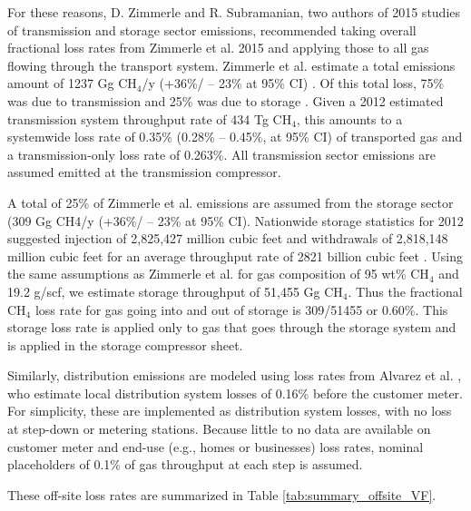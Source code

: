 \documentclass[11pt]{report}
\begin{document}
For these reasons, D. Zimmerle and R. Subramanian, two authors of 2015 studies of transmission and storage sector emissions, recommended \cite{ZimmerleEmail} taking overall fractional loss rates from Zimmerle et al. 2015 \cite{Zimmerle2015} and applying those to all gas flowing through the transport system. Zimmerle et al. estimate a total emissions amount of 1237 Gg CH$_4$/y (+36\%/ -- 23\% at 95\% CI) \cite[p. 9378]{Zimmerle2015}. Of this total loss, 75\% was due to transmission and 25\% was due to storage \cite[Fig. 6]{Zimmerle2015}. Given a 2012 estimated transmission system throughput rate of 434 Tg CH$_4$, this amounts to a systemwide loss rate of 0.35\% (0.28\% -- 0.45\%, at 95\% CI) of transported gas and a transmission-only loss rate of 0.263\%.  All transmission sector emissions are assumed emitted at the transmission compressor. 

A total of 25\% of Zimmerle et al. \cite{Zimmerle2015} emissions are assumed from the storage sector (309 Gg CH4/y (+36\%/ -- 23\% at 95\% CI). Nationwide storage statistics for 2012 suggested injection of 2,825,427 million cubic feet and withdrawals of 2,818,148 million cubic feet for an average throughput rate of 2821 billion cubic feet \cite{EIA2018}. Using the same assumptions as Zimmerle et al. for gas composition \cite[SI section 16]{Zimmerle2015} of 95 wt\% CH$_4$ and 19.2 g/scf, we estimate storage throughput of 51,455 Gg CH$_4$. Thus the fractional CH$_4$ loss rate for gas going into and out of storage is 309/51455 or 0.60\%. This storage loss rate is applied only to gas that goes through the storage system and is applied in the storage compressor sheet.

Similarly, distribution emissions are modeled using loss rates from Alvarez et al. \cite[SI p. 14]{Alvarez2018}, who estimate local distribution system losses of 0.16\% before the customer meter.  For simplicity, these are implemented as distribution system losses, with no loss at step-down or metering stations.  Because little to no data are available on customer meter and end-use (e.g., homes or businesses) loss rates, nominal placeholders of 0.1\% of gas throughput at each step is assumed.

These off-site loss rates are summarized in Table \ref{tab:summary_offsite_VF}.
\end{document}
